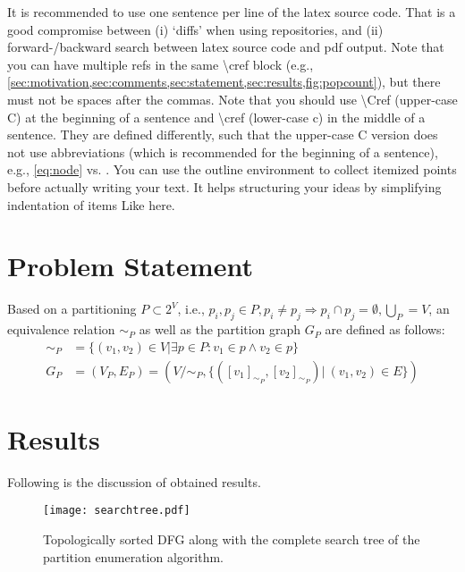 \begin{outline}
  \1 It is recommended to use one sentence per line of the latex source code.
  That is a good compromise between (i) `diffs' when using repositories, and (ii) forward-/backward search between latex source code and pdf output.
  \1 Note that you can have multiple refs in the same \textbackslash cref block (e.g., \cref{sec:motivation,sec:comments,sec:statement,sec:results,fig:popcount}), but there must not be spaces after the commas.
  \1 Note that you should use \textbackslash Cref (upper-case C) at the beginning of a sentence and \textbackslash cref (lower-case c) in the middle of a sentence.
  They are defined differently, such that the upper-case C version does not use abbreviations (which is recommended for the beginning of a sentence), e.g., \cref{eq:node} vs. .
  \1 You can use the outline environment to collect itemized points before actually writing your text.
    \2 It helps structuring your ideas by simplifying indentation of items
    \3 Like here.
\end{outline}


\section{Problem Statement}
\label{sec:statement}

Based on a partitioning $P \subset 2^V$, i.e., $p_i, p_j \in P, p_i \ne p_j \Rightarrow p_i \cap p_j = \emptyset, \bigcup\limits_P = V$, an equivalence relation $\sim_P$ as well as the partition graph $G_P$ are defined as follows:
\begin{align}
  \sim_P &= \{(v_1,v_2) \in V | \exists p \in P: v_1\in p \wedge v_2 \in p\}\\
  G_P &= (V_P, E_P) = (V/\sim_P, \{ ([v_1]_{\sim_P}, [v_2]_{\sim_P}) |\: (v_1,v_2) \in E \})
  \label{eq:node}
\end{align}



\section{Results}
\label{sec:results}

Following is the discussion of obtained results.

\begin{figure}[ht]
  \center
  \texttt{[image: searchtree.pdf]}
  \caption{Topologically sorted DFG along with the complete search tree of the partition enumeration algorithm.}
  \label{fig:searchtree}
\end{figure}



